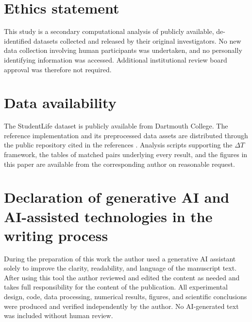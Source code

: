 \documentclass[preprint,12pt,authoryear]{elsarticle}
\newcommand{\dt}{$\Delta T$}
\begin{document}
\section*{Ethics statement}

This study is a secondary computational analysis of publicly available,
de-identified datasets collected and released by their original
investigators. No new data collection involving human participants was
undertaken, and no personally identifying information was accessed.
Additional institutional review board approval was therefore not
required.

\section*{Data availability}

The StudentLife dataset is publicly available from Dartmouth College.
The reference implementation and its preprocessed
data assets are distributed through the public repository cited in the
references \citep{iflrepo}. Analysis scripts supporting the \dt{}
framework, the tables of matched pairs underlying every result, and
the figures in this paper are available from the corresponding author
on reasonable request.

\section*{Declaration of generative AI and AI-assisted technologies in
the writing process}

During the preparation of this work the author used a generative AI
assistant solely to improve the clarity, readability, and language of the
manuscript text. After using this tool the author reviewed and edited
the content as needed and takes full responsibility for the content of
the publication. All experimental design, code, data processing,
numerical results, figures, and scientific conclusions were produced and
verified independently by the author. No AI-generated text was included
without human review.
\end{document}
